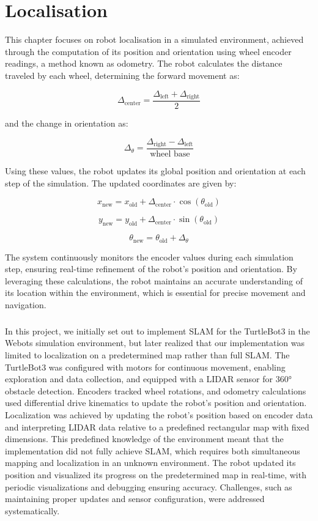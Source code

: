 
\chapter{Localisation}

This chapter focuses on robot localisation in a simulated environment, achieved through the computation of its position and orientation using wheel encoder readings, a method known as odometry. The robot calculates the distance traveled by each wheel, determining the forward movement as:

\[
\Delta_{\text{center}} = \frac{\Delta_{\text{left}} + \Delta_{\text{right}}}{2}
\]

and the change in orientation as:

\[
\Delta_{\theta} = \frac{\Delta_{\text{right}} - \Delta_{\text{left}}}{\text{wheel base}}
\]

Using these values, the robot updates its global position and orientation at each step of the simulation. The updated coordinates are given by:

\[
x_{\text{new}} = x_{\text{old}} + \Delta_{\text{center}} \cdot \cos(\theta_{\text{old}})
\]

\[
y_{\text{new}} = y_{\text{old}} + \Delta_{\text{center}} \cdot \sin(\theta_{\text{old}})
\]

\[
\theta_{\text{new}} = \theta_{\text{old}} + \Delta_{\theta}
\]

The system continuously monitors the encoder values during each simulation step, ensuring real-time refinement of the robot's position and orientation. By leveraging these calculations, the robot maintains an accurate understanding of its location within the environment, which is essential for precise movement and navigation.

\paragraph*{}
In this project, we initially set out to implement SLAM for the TurtleBot3 in the Webots simulation environment, but later realized that our implementation was limited to localization on a predetermined map rather than full SLAM. The TurtleBot3 was configured with motors for continuous movement, enabling exploration and data collection, and equipped with a LIDAR sensor for 360° obstacle detection. Encoders tracked wheel rotations, and odometry calculations used differential drive kinematics to update the robot's position and orientation. Localization was achieved by updating the robot’s position based on encoder data and interpreting LIDAR data relative to a predefined rectangular map with fixed dimensions. This predefined knowledge of the environment meant that the implementation did not fully achieve SLAM, which requires both simultaneous mapping and localization in an unknown environment. The robot updated its position and visualized its progress on the predetermined map in real-time, with periodic visualizations and debugging ensuring accuracy. Challenges, such as maintaining proper updates and sensor configuration, were addressed systematically.

